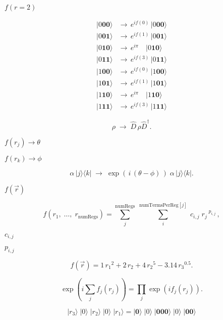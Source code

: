 \documentclass{article}
\begin{document}
$f(r=2)$
\pagebreak

\[ 
  \begin{aligned}
    |0\mathbf{00}\rangle & \rightarrow \, e^{i f(0)}\,|0\mathbf{00}\rangle \\
    |0\mathbf{01}\rangle & \rightarrow \, e^{i f(1)}\,|0\mathbf{01}\rangle \\
    |0\mathbf{10}\rangle & \rightarrow \, e^{i \pi} \hspace{12pt} |0\mathbf{10}\rangle \\
    |0\mathbf{11}\rangle & \rightarrow \, e^{i f(3)}\,|0\mathbf{11}\rangle \\
    |1\mathbf{00}\rangle & \rightarrow \, e^{i f(0)}\,|1\mathbf{00}\rangle \\
    |1\mathbf{01}\rangle & \rightarrow \, e^{i f(1)}\,|1\mathbf{01}\rangle \\
    |1\mathbf{10}\rangle & \rightarrow \, e^{i \pi} \hspace{12pt} |1\mathbf{10}\rangle \\
    |1\mathbf{11}\rangle & \rightarrow \, e^{i f(3)}\,|1\mathbf{11}\rangle
  \end{aligned}
  \]
\pagebreak

\[
     \rho \; \rightarrow \; \hat{D} \, \rho \hat{D}^\dagger.
  \]
\pagebreak

$f(r_j) \rightarrow \theta$
\pagebreak

$f(r_k) \rightarrow \phi$
\pagebreak

\[
     \alpha \, |j\rangle\langle k| \; \rightarrow \; 
         \exp(\, i \, (\theta - \phi) \, ) \; \alpha \, |j\rangle\langle k|.
  \]
\pagebreak

$f(\vec{r})$
\pagebreak

\[ 
   f(r_1, \; \dots, \; r_{\text{numRegs}}) = \sum\limits_j^{\text{numRegs}} \; \sum\limits_{i}^{\text{numTermsPerReg}[j]} \; c_{i,j} \; {r_j}^{\; p_{i,j}}\,,
  \]
\pagebreak

$c_{i,j}$
\pagebreak

$p_{i,j}$
\pagebreak

\[
     f(\vec{r}) =  1 \, {r_1}^2 + 2 \, {r_2} + 4 \, {r_2}^{5} - 3.14 \, {r_3}^{0.5}.
  \]
\pagebreak

\[  \exp( i \sum_j f_j(r_j) ) = \prod_j \exp(i f_j(r_j) ). \]
\pagebreak

\[
     |r_3\rangle \; |0\rangle \; |r_2\rangle \; |0\rangle \; |r_1\rangle = 
     |\mathbf{0}\rangle \; |0\rangle \; |\mathbf{000}\rangle \; |0\rangle \; |\mathbf{00}\rangle
  \]
\pagebreak
\end{document}
